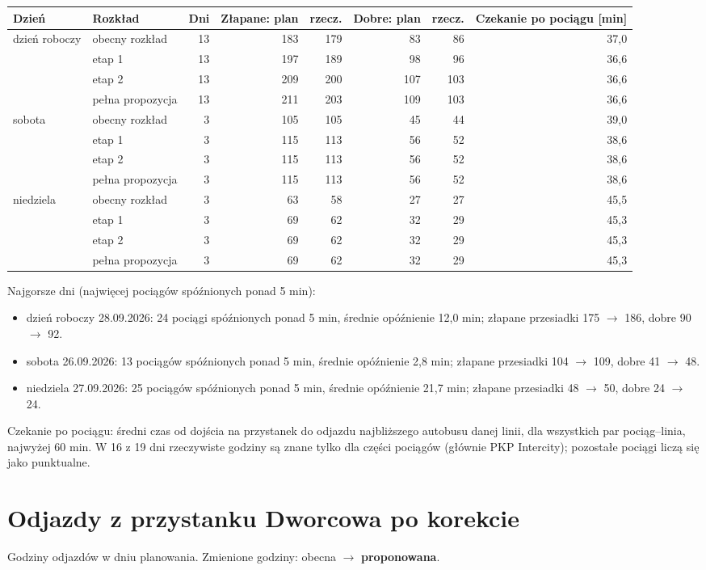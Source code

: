 \documentclass[10pt,a4paper]{article}
\newcommand{\mut}[1]{\textcolor{muted}{#1}}
\begin{document}
{\footnotesize
\begin{center}\begin{tabular}{@{}l l r r r r r r@{}}\toprule
Dzień & Rozkład & Dni & Złapane: plan & rzecz. & Dobre: plan & rzecz. & Czekanie po pociągu [min] \\ \midrule
dzień roboczy & obecny rozkład & 13 & 183 & 179 & 83 & 86 & 37,0 \\
 & etap 1 & 13 & 197 & 189 & 98 & 96 & 36,6 \\
 & etap 2 & 13 & 209 & 200 & 107 & 103 & 36,6 \\
 & pełna propozycja & 13 & 211 & 203 & 109 & 103 & 36,6 \\
sobota & obecny rozkład & 3 & 105 & 105 & 45 & 44 & 39,0 \\
 & etap 1 & 3 & 115 & 113 & 56 & 52 & 38,6 \\
 & etap 2 & 3 & 115 & 113 & 56 & 52 & 38,6 \\
 & pełna propozycja & 3 & 115 & 113 & 56 & 52 & 38,6 \\
niedziela & obecny rozkład & 3 & 63 & 58 & 27 & 27 & 45,5 \\
 & etap 1 & 3 & 69 & 62 & 32 & 29 & 45,3 \\
 & etap 2 & 3 & 69 & 62 & 32 & 29 & 45,3 \\
 & pełna propozycja & 3 & 69 & 62 & 32 & 29 & 45,3 \\
\bottomrule\end{tabular}\end{center}}
Najgorsze dni (najwięcej pociągów spóźnionych ponad 5 min):
\begin{itemize}
\item dzień roboczy 28.09.2026: 24 pociągi spóźnionych ponad 5 min, średnie opóźnienie 12,0 min; złapane przesiadki 175 $\to$ 186, dobre 90 $\to$ 92.
\item sobota 26.09.2026: 13 pociągów spóźnionych ponad 5 min, średnie opóźnienie 2,8 min; złapane przesiadki 104 $\to$ 109, dobre 41 $\to$ 48.
\item niedziela 27.09.2026: 25 pociągów spóźnionych ponad 5 min, średnie opóźnienie 21,7 min; złapane przesiadki 48 $\to$ 50, dobre 24 $\to$ 24.
\end{itemize}
\mut{\footnotesize Czekanie po pociągu: średni czas od dojścia na przystanek do odjazdu najbliższego autobusu danej linii, dla wszystkich par pociąg--linia, najwyżej 60 min. W 16 z 19 dni rzeczywiste godziny są znane tylko dla części pociągów (głównie PKP Intercity); pozostałe pociągi liczą się jako punktualne.}
\section{Odjazdy z przystanku Dworcowa po korekcie}
Godziny odjazdów w dniu planowania. Zmienione godziny: obecna $\to$ \textbf{proponowana}.
\end{document}
